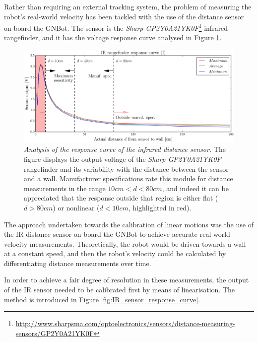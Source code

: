 \documentclass[12pt,twoside]{report}
\begin{document}
Rather than requiring an external tracking system, the problem of measuring the robot's real-world velocity has been tackled with the use of the distance sensor on-board the GNBot.
The sensor is the \emph{Sharp GP2Y0A21YK0F}\footnote{\url{http://www.sharpsma.com/optoelectronics/sensors/distance-measuring-sensors/GP2Y0A21YK0F}} infrared rangefinder, and it has the voltage response curve analysed in Figure \ref{fig:IR_sensor_response_curve_B}.




\begin{figure}[hbtp]
\centerline{
\includegraphics[width=1.1\linewidth]{IR_sensor_response_curve_B}}
\caption[Analysis of the response curve of the infrared distance sensor]{\emph{Analysis of the response curve of the infrared distance sensor.}
The figure displays the output voltage of the \emph{Sharp GP2Y0A21YK0F} rangefinder and its variability with the distance between the sensor and a wall. Manufacturer specifications rate this module for distance measurements in the range $10cm<d<80cm$, and indeed it can be appreciated that the response outside that region is either flat ($d>80cm$) or nonlinear ($d<10cm$, highlighted in red).
}
\label{fig:IR_sensor_response_curve_B}
\end{figure}


The approach undertaken towards the calibration of linear motions was the use of the IR distance sensor on-board the GNBot to achieve accurate real-world velocity measurements. Theoretically, the robot would be driven towards a wall at a constant speed, and then the robot's velocity could be calculated by differentiating distance measurements over time.

In order to achieve a fair degree of resolution in these measurements, the output of the IR sensor needed to be calibrated first by means of linearisation. The method is introduced in Figure \ref{fig:IR_sensor_response_curve}.
\end{document}

